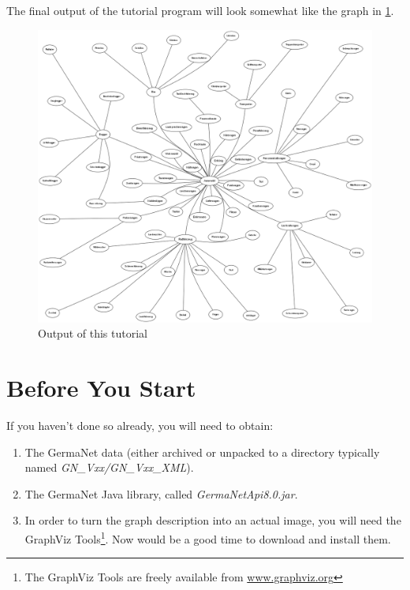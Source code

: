 \documentclass[12pt,a4paper,english,utf8]{report}
\begin{document}
The final output of the tutorial program will look somewhat like the graph in \ref{autograph}.

\begin{figure}[htb] 
	\begin{center}
		\includegraphics[scale=0.3]{auto_graph.png}
	\end{center}
	\caption{Output of this tutorial}
	\label{autograph}
\end{figure}

\section{Before You Start}
\label{tutorialStarts}
If you haven't done so already, you will need to obtain:

\renewcommand{\labelenumi}{\arabic{enumi}}
\begin{enumerate}
	\item The GermaNet data (either archived or unpacked to a directory typically named \emph{GN\_Vxx/GN\_Vxx\_XML}).
	\item The GermaNet Java library, called \emph{GermaNetApi8.0.jar}.
	\item In order to turn the graph description into an actual image, you will need the GraphViz Tools\footnote{The GraphViz Tools are freely available from \href{www.graphviz.org}{www.graphviz.org}}. Now would be a good time to download and install them.
\end{enumerate}
\end{document}
